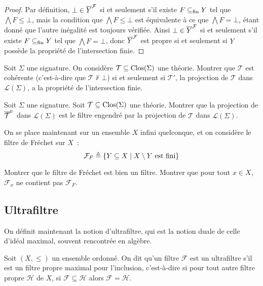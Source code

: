 \begin{proof}
  Par définition, $\bot\in \overline{Y}^{\mathcal F}$ si et seulement s'il existe $F\subseteq_{\mathrm{fin}} Y$
  tel que $\bigwedge F \leq \bot$, mais la condition que $\bigwedge F\leq \bot$
  est équivalente à ce que $\bigwedge F = \bot$, étant donné que l'autre
  inégalité est toujours vérifiée. Ainsi $\bot\in\overline{Y}^{\mathcal F}$ si et seulement
  s'il existe $F\subseteq_{\mathrm{fin}} Y$ tel que $\bigwedge F = \bot$, donc $\overline{Y}^{\mathcal F}$ est
  propre si et seulement si $Y$ possède la propriété de l'intersection finie.
\end{proof}

\begin{exercise}
  Soit $\Sigma$ une signature. On considère $\mathcal T\subseteq\operatorname{Clos}(\Sigma)$
  une théorie. Montrer que $\mathcal T$ est cohérente (c'est-à-dire que
  $\mathcal T\nvdash \bot$) si et seulement si $\mathcal T'$, la projection
  de $\mathcal T$ dans $\mathcal L(\Sigma)$, a la propriété de l'intersection
  finie.
\end{exercise}

\begin{exercise}
  Soit $\Sigma$ une signature. Soit $\mathcal T\subseteq\operatorname{Clos}(\Sigma)$ une
  théorie. Montrer que la projection de $\overline{\mathcal T}^{\vDash}$ dans
  $\mathcal L(\Sigma)$ est le filtre engendré par la projection de $\mathcal T$
  dans $\mathcal L(\Sigma)$.
\end{exercise}

\begin{exercise}
  On se place maintenant sur un ensemble $X$ infini quelconque, et on considère
  le filtre de Fréchet sur $X$~:
  \[\mathcal F_F \triangleq \{Y\subseteq X \mid X \setminus Y\text{ est fini}\}\]

  Montrer que le filtre de Fréchet est bien un filtre. Montrer que pour tout
  $x \in X$, $\mathcal F_x$ ne contient pas $\mathcal F_F$.
\end{exercise}

\subsection{Ultrafiltre}\label{sbsct.ultrafiltre}

On définit maintenant la notion d'ultrafiltre, qui est la notion duale de celle
d'idéal maximal, souvent rencontrée en algèbre.

\begin{definition}[Ultrafiltre]
  Soit $(X,\leq)$ un ensemble ordonné. On dit qu'un filtre $\mathcal F$ est un
  ultrafiltre s'il est un filtre propre maximal pour l'inclusion, c'est-à-dire
  si pour tout autre filtre propre $\mathcal H$ de $X$, si
  $\mathcal F \subseteq\mathcal H$ alors $\mathcal F = \mathcal H$.
\end{definition}

